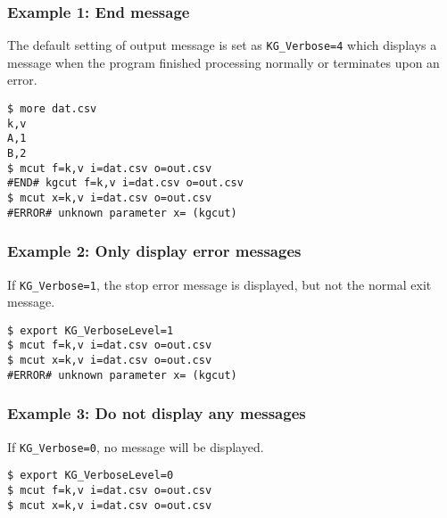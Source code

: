 \subsubsection*{Example 1: End message}

The default setting of output message is set as \verb|KG_Verbose=4| which displays a message when the program finished processing normally or terminates upon an error.


\begin{Verbatim}[baselinestretch=0.7,frame=single]
$ more dat.csv
k,v
A,1
B,2
$ mcut f=k,v i=dat.csv o=out.csv
#END# kgcut f=k,v i=dat.csv o=out.csv
$ mcut x=k,v i=dat.csv o=out.csv
#ERROR# unknown parameter x= (kgcut)
\end{Verbatim}
\subsubsection*{Example 2: Only display error messages}

If \verb|KG_Verbose=1|, the stop error message is displayed, but not the normal exit message.


\begin{Verbatim}[baselinestretch=0.7,frame=single]
$ export KG_VerboseLevel=1
$ mcut f=k,v i=dat.csv o=out.csv
$ mcut x=k,v i=dat.csv o=out.csv
#ERROR# unknown parameter x= (kgcut)
\end{Verbatim}
\subsubsection*{Example 3: Do not display any messages}

If \verb|KG_Verbose=0|, no message will be displayed. 


\begin{Verbatim}[baselinestretch=0.7,frame=single]
$ export KG_VerboseLevel=0
$ mcut f=k,v i=dat.csv o=out.csv
$ mcut x=k,v i=dat.csv o=out.csv
\end{Verbatim}
